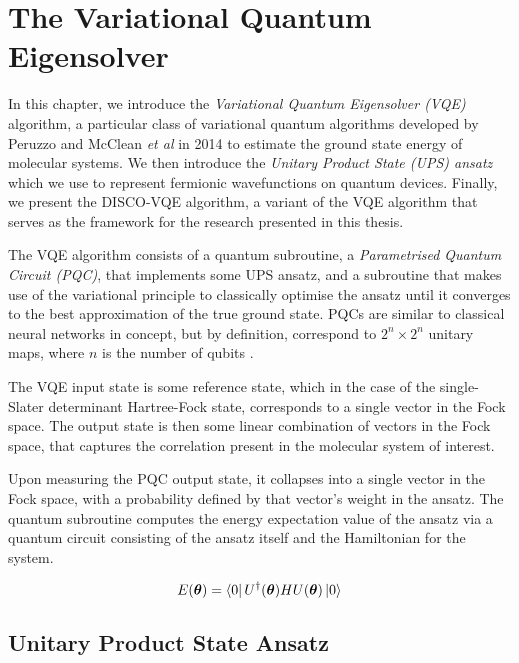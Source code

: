 \section{The Variational Quantum Eigensolver}%
\label{vqe}

In this chapter, we introduce the \textit{Variational Quantum Eigensolver (VQE)} algorithm, a particular class of variational quantum algorithms developed by Peruzzo and McClean \textit{et al} \cite{Peruzzo2014} in 2014 to estimate the ground state energy of molecular systems. We then introduce the \textit{Unitary Product State (UPS) ansatz} which we use to represent fermionic wavefunctions on quantum devices. Finally, we present the DISCO-VQE algorithm, a variant of the VQE algorithm that serves as the framework for the research presented in this thesis.

The VQE algorithm consists of a quantum subroutine, a \textit{Parametrised Quantum Circuit (PQC)}, that implements some UPS ansatz, and a subroutine that makes use of the variational principle to classically optimise the ansatz until it converges to the best approximation of the true ground state. PQCs are similar to classical neural networks in concept, but by definition, correspond to $2^n \times 2^n$ unitary maps, where $n$ is the number of qubits \cite{Yeung2020}.

The VQE input state is some reference state, which in the case of the single-Slater determinant Hartree-Fock state, corresponds to a single vector in the Fock space. The output state is then some linear combination of vectors in the Fock space, that captures the correlation present in the molecular system of interest.

Upon measuring the PQC output state, it collapses into a single vector in the Fock space, with a probability defined by that vector's weight in the ansatz. The quantum subroutine computes the energy expectation value of the ansatz via a quantum circuit consisting of the ansatz itself and the Hamiltonian for the system.

\begin{equation*}
    E(\bm\theta) = \bra{0} U^\dagger(\bm\theta) H U(\bm\theta) \ket{0} 
\end{equation*}


\subsection{Unitary Product State Ansatz}%
\label{ups-ansatz}

